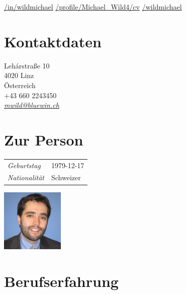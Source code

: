 \documentclass[line,11pt,a4paper]{resume}
\newcommand{\mail}[1]{\textsl{\href{mailto:#1}{#1}}}
\begin{document}
\begin{resume}
\vspace{-4mm}
\-\hspace{-12.3mm}\begin{minipage}{15cm}
\href{https://linkedin.com/in/wildmichael}{\faLinkedinSquare/in/wildmichael}\quad
\href{https://xing.com/profile/Michael_Wild4/cv}{\faXingSquare/profile/Michael\_Wild4/cv}\quad
\href{https://github.com/wildmichael}{\faGithubSquare/wildmichael}
\end{minipage}


\begin{multicols}{3}

\section{\mysidestyle Kontaktdaten}\vspace{0.9mm}

Leh\'{a}rstra{\ss}e 10 \\
4020 Linz \\
Österreich \\
+43 660 2243450 \\
\mail{mwild@bluewin.ch}\\

\columnbreak

\section{\mysidestyle Zur Person}\vspace{2mm}

\begin{tabular}{@{}ll}
\textsl{Geburtstag} & 1979-12-17 \\
\textsl{Nationalität}   & Schweizer
\end{tabular}

\columnbreak
\vspace*{-9mm}\hfill\includegraphics[width=30mm]{mwild}

\end{multicols}

\section{\mysidestyle Berufserfahrung}\vspace{2mm}


\end{resume}
\end{document}
